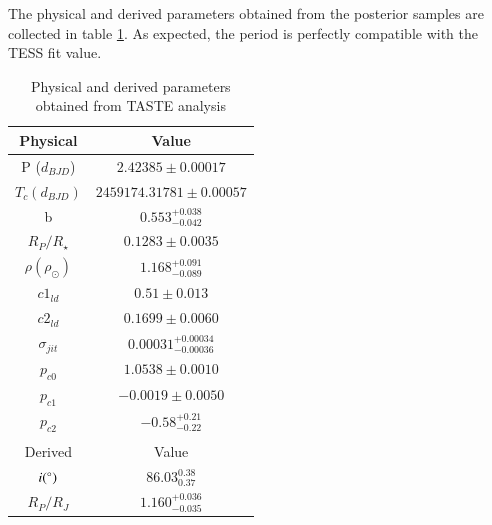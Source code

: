 \documentclass{aa}
\begin{document}
The physical and derived parameters obtained from the posterior 
samples are collected in table \ref{table:2}. As expected, the period is perfectly compatible with the TESS fit value.
 \begin{table}[H]
 \small
 \centering
    \begin{tabular}{cc}
    \hline
    Physical& Value \\
    \hline
    P ($d_{BJD}$)   &  $2.42385\pm0.00017$ \\
    $T_{c} (d_{BJD})$ &  $2459174.31781 \pm 0.00057$ \\ 
    b & $0.553_{-0.042}^{+0.038}$ \\
    $R_{P }/ R_{\star}$&  $0.1283 \pm 0.0035$\\
    $\rho (\rho_{\odot})$ & $1.168_{-0.089}^{+0.091}$\\
    $c1_{ld}$ & $0.51\pm0.013$ \\
    $c2_{ld}$ & $0.1699 \pm 0.0060$\\
    $\sigma_{jit}$ & $0.00031_{-0.00036}^{+0.00034}$ \\
    $p_{c0}$ & $1.0538 \pm 0.0010$\\
    $p_{c1}$ &$-0.0019\pm0.0050$\\
    $p_{c2}$ &$-0.58_{-0.22}^{+0.21}$\\ 
    \hline
    \\    
    \hline
    Derived & Value \\
    \hline
    $i (\degree)$ & $86.03_{0.37}^{0.38}$ \\
    $R_P/R_J$ & $1.160^{+0.036}_{-0.035}$\\
    \hline
    \end{tabular} 
  \caption{Physical and derived parameters obtained from TASTE analysis}
 \label{table:2}
 \end{table}
\end{document}
